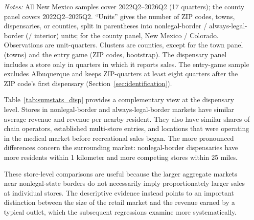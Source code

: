 \documentclass[english,12pt]{article}
\begin{document}
\begin{table}[htbp]
\centering\footnotesize
\caption{Samples}
\label{tab:samples}

\begin{minipage}{0.97\textwidth}
\vspace{0.4em}\footnotesize
\textit{Notes:} All New Mexico samples cover 2022Q2--2026Q2 (17 quarters); the county panel covers 2022Q2--2025Q2. ``Units'' gives the number of ZIP codes, towns, dispensaries, or counties, split in parentheses into nonlegal-border / always-legal-border (/ interior) units; for the county panel, New Mexico / Colorado. Observations are unit-quarters. Clusters are counties, except for the town panel (towns) and the entry game (ZIP codes, bootstrap). The dispensary panel includes a store only in quarters in which it reports sales. The entry-game sample excludes Albuquerque and keeps ZIP-quarters at least eight quarters after the ZIP code's first dispensary (Section~\ref{sec:identification}).
\end{minipage}
\end{table}


Table~\ref{tab:sumstats_disp} provides a complementary view at the dispensary level. Stores in nonlegal-border and always-legal-border markets have similar average revenue and revenue per nearby resident. They also have similar shares of chain operators, established multi-store entries, and locations that were operating in the medical market before recreational sales began. The more pronounced differences concern the surrounding market: nonlegal-border dispensaries have more residents within 1 kilometer and more competing stores within 25 miles.

These store-level comparisons are useful because the larger aggregate markets near nonlegal-state borders do not necessarily imply proportionately larger sales at individual stores. The descriptive evidence instead points to an important distinction between the size of the retail market and the revenue earned by a typical outlet, which the subsequent regressions examine more systematically.
\end{document}
